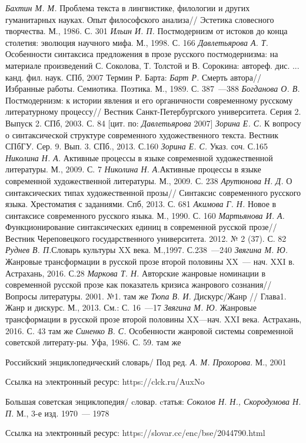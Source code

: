 {\textit{Бахтин М. М.} Проблема текста в лингвистике, филологии и других гуманитарных науках. Опыт философского анализа// Эстетика словесного творчества. М., 1986. С. 301}
{\textit{Ильин И. П.} Постмодернизм от истоков до конца столетия: эволюция научного мифа. М., 1998. С. 166}
{\textit{Давлетьярова А. Т.} Особенности синтаксиса предложения в прозе русского постмодернизма: на материале произведений С. Соколова, Т. Толстой и В. Сорокина: автореф. дис. ... канд. фил. наук. СПб, 2007}
{Термин Р. Барта: \textit{Барт Р.} Смерть автора// Избранные работы. Семиотика. Поэтика. М., 1989. С. 387~---388}
{\textit{Богданова О. В.} Постмодернизм: к истории явления и его органичности современному русскому литературному процессу// Вестник Санкт-Петербургского университета. Серия 2. Выпуск 2. СПб, 2003. С. 84 [цит. по: \textit{Давлетьярова} 2007]}
{\textit{Зорина Е. С.} К вопросу о синтаксической структуре современного художественного текста. Вестник СПбГУ. Сер. 9. Вып. 3. СПб., 2013. С.160}
{\textit{Зорина Е. С.} Указ. соч. С.165}
{\textit{Николина Н. А.} Активные процессы в языке современной художественной литературы. М., 2009. С. 7}
{\textit{Николина Н. А.}Активные процессы в языке современной художественной литературы. М., 2009. С. 238}
{\textit{Арутюнова Н. Д.} О синтаксических типах художественной прозы// Синтаксис современного русского языка. Хрестоматия с заданиями. Спб, 2013. С. 681}
{\textit{Акимова Г. Н.} Новое в синтаксисе современного русского языка. М., 1990. С. 160}
{\textit{Мартьянова И. А. }Функционирование синтаксических единиц в современной русской прозе// Вестник Череповецкого государственного университета. 2012. № 2 (37). С. 82}
{\textit{Руднев В. П.}Словарь культуры XX века. М.,1997. С.238~---240}
{\textit{Звягина М. Ю. }{Жанровые трансформации в русской прозе второй половины XX~--- нач. XXI в. Астрахань, 2016. С.28}}
{{ }\textit{Маркова Т. Н.} Авторские жанровые номинации в современной русской прозе как показатель кризиса жанрового сознания// Вопросы литературы. 2001. №1.}
{там же}
{\textit{Тюпа В. И.} Дискурс/Жанр // Глава1. Жанр и дискурс. М., 2013. См.: С. 16~---17}
{\textit{Звягина М. Ю.} Жанровые трансформации в русской прозе второй половины XX—нач. XXI века. Астрахань, 2016. С. 43}
{там же}
{\textit{Синенко В. С.} Особенности жанровой системы современной советской литерату-ры. Уфа, 1986.  С. 59.}
{там же}
{{Российский энциклопедический словарь/ Под ред. \textit{А. М. Прохорова}. М., 2001 }\par
    {Ссылка на электронный ресурс:
    https://clck.ru/AuxNo}}
{{Большая советская энциклопедия/ cловар. cтатья: \textit{Соколов Н. Н., Скородумова Н. П.} М., 3-е изд. 1970~--- 1978}\par{Ссылка на электронный ресурс: https://slovar.cc/enc/bse/2044790.html}}
